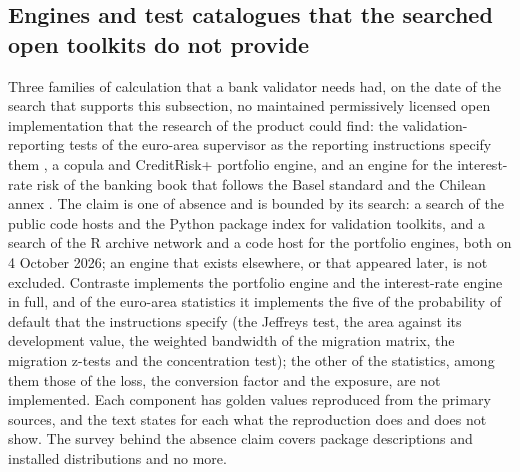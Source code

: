 \subsection{Engines and test catalogues that the searched open toolkits do not provide}
\label{sec:bs6}

Three families of calculation that a bank validator needs had, on the date of the search that supports this subsection, no maintained permissively
licensed open implementation that the research of the product could find: the validation-reporting tests of the euro-area supervisor as the reporting
instructions specify them \citep{credit-scoring:ecb2019}, a copula and CreditRisk+ portfolio engine, and an engine for the interest-rate risk of the banking book
that follows the Basel standard and the Chilean annex \citep{proposed:bcbssrp31,alm:cmf2025}. The claim is one of absence and is bounded by its search: a
search of the public code hosts and the Python package index for validation toolkits, and a search of the R archive network and a code host for the portfolio
engines, both on 4 October 2026; an engine that exists elsewhere, or that appeared later, is not excluded. Contraste implements the portfolio engine and the interest-rate engine in full, and of the euro-area statistics it implements the five of the probability of default that the
instructions specify (the Jeffreys test, the area against its development value, the weighted bandwidth of the migration matrix, the migration z-tests and the concentration test); the other
\pxPpSixAbsent{} of the \pxPpSixSections{} statistics, among them those of the loss, the conversion factor and the exposure, are not implemented. Each component has golden values reproduced
from the primary sources, and the text states for each what the reproduction does and does not show. The survey behind the absence claim covers \pxPpSixPypi{} package descriptions and
\pxPpSixDist{} installed distributions and no more.

